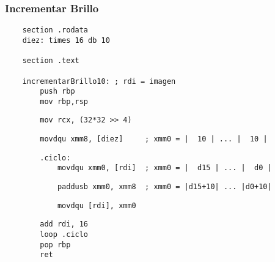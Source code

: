 \documentclass[aspectratio=169]{beamer}
\begin{document}
\begin{frame}[fragile]
    \frametitle{Incrementar Brillo}
    \scriptsize
    \begin{verbatim}
    section .rodata
    diez: times 16 db 10

    section .text

    incrementarBrillo10: ; rdi = imagen
        push rbp
        mov rbp,rsp
    \end{verbatim}
    \vspace{-0.8cm} \pause
    \begin{verbatim}
        mov rcx, (32*32 >> 4)
    \end{verbatim}
    \vspace{-0.8cm} \pause
    \begin{verbatim}
        movdqu xmm8, [diez]     ; xmm0 = |  10 | ... |  10 |
    \end{verbatim}
    \vspace{-0.8cm} \pause
    \begin{verbatim}
        .ciclo:
            movdqu xmm0, [rdi]  ; xmm0 = |  d15 | ... |  d0 |
    \end{verbatim}
    \vspace{-0.8cm} \pause
    \begin{verbatim}
            paddusb xmm0, xmm8  ; xmm0 = |d15+10| ... |d0+10|
    \end{verbatim}
    \vspace{-0.8cm} \pause
    \begin{verbatim}
            movdqu [rdi], xmm0
    \end{verbatim}
    \vspace{-0.8cm} \pause
    \begin{verbatim}
        add rdi, 16
        loop .ciclo
        pop rbp
        ret
    \end{verbatim}
\end{frame}
\end{document}
